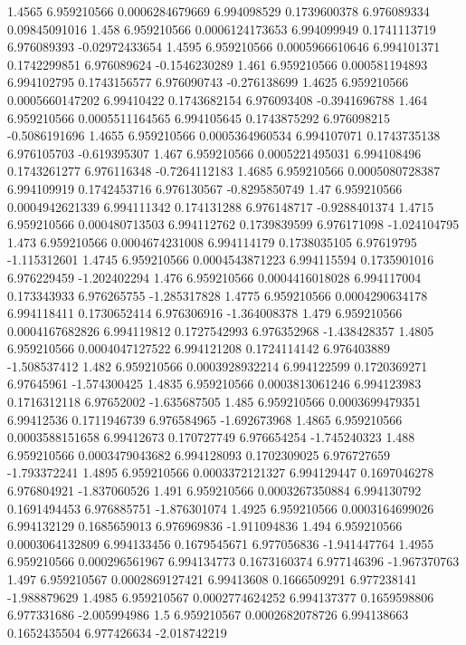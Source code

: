 {1.4565 6.959210566 0.0006284679669 6.994098529 0.1739600378 6.976089334 0.09845091016
1.458 6.959210566 0.0006124173653 6.994099949 0.1741113719 6.976089393 -0.02972433654
1.4595 6.959210566 0.0005966610646 6.994101371 0.1742299851 6.976089624 -0.1546230289
1.461 6.959210566 0.000581194893 6.994102795 0.1743156577 6.976090743 -0.276138699
1.4625 6.959210566 0.0005660147202 6.99410422 0.1743682154 6.976093408 -0.3941696788
1.464 6.959210566 0.0005511164565 6.994105645 0.1743875292 6.976098215 -0.5086191696
1.4655 6.959210566 0.0005364960534 6.994107071 0.1743735138 6.976105703 -0.619395307
1.467 6.959210566 0.0005221495031 6.994108496 0.1743261277 6.976116348 -0.7264112183
1.4685 6.959210566 0.0005080728387 6.994109919 0.1742453716 6.976130567 -0.8295850749
1.47 6.959210566 0.0004942621339 6.994111342 0.174131288 6.976148717 -0.9288401374
1.4715 6.959210566 0.000480713503 6.994112762 0.1739839599 6.976171098 -1.024104795
1.473 6.959210566 0.0004674231008 6.994114179 0.1738035105 6.97619795 -1.115312601
1.4745 6.959210566 0.0004543871223 6.994115594 0.1735901016 6.976229459 -1.202402294
1.476 6.959210566 0.0004416018028 6.994117004 0.173343933 6.976265755 -1.285317828
1.4775 6.959210566 0.0004290634178 6.994118411 0.1730652414 6.976306916 -1.364008378
1.479 6.959210566 0.0004167682826 6.994119812 0.1727542993 6.976352968 -1.438428357
1.4805 6.959210566 0.0004047127522 6.994121208 0.1724114142 6.976403889 -1.508537412
1.482 6.959210566 0.0003928932214 6.994122599 0.1720369271 6.97645961 -1.574300425
1.4835 6.959210566 0.0003813061246 6.994123983 0.1716312118 6.97652002 -1.635687505
1.485 6.959210566 0.0003699479351 6.99412536 0.1711946739 6.976584965 -1.692673968
1.4865 6.959210566 0.0003588151658 6.99412673 0.170727749 6.976654254 -1.745240323
1.488 6.959210566 0.0003479043682 6.994128093 0.1702309025 6.976727659 -1.793372241
1.4895 6.959210566 0.0003372121327 6.994129447 0.1697046278 6.976804921 -1.837060526
1.491 6.959210566 0.0003267350884 6.994130792 0.1691494453 6.976885751 -1.876301074
1.4925 6.959210566 0.0003164699026 6.994132129 0.1685659013 6.976969836 -1.911094836
1.494 6.959210566 0.0003064132809 6.994133456 0.1679545671 6.977056836 -1.941447764
1.4955 6.959210566 0.000296561967 6.994134773 0.1673160374 6.977146396 -1.967370763
1.497 6.959210567 0.0002869127421 6.99413608 0.1666509291 6.977238141 -1.988879629
1.4985 6.959210567 0.0002774624252 6.994137377 0.1659598806 6.977331686 -2.005994986
1.5 6.959210567 0.0002682078726 6.994138663 0.1652435504 6.977426634 -2.018742219
}\loaddata
